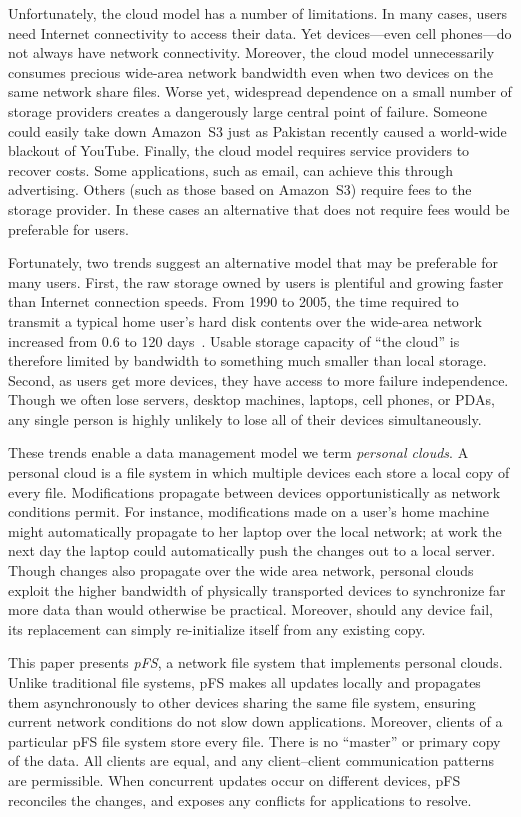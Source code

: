 Unfortunately, the cloud model has a number of limitations.  In many
cases, users need Internet connectivity to access their data.  Yet
devices---even cell phones---do not always have network connectivity.
Moreover, the cloud model unnecessarily consumes precious wide-area
network bandwidth even when two devices on the same network share
files.  Worse yet, widespread dependence on a small number of storage
providers creates a dangerously large central point of failure.
Someone could easily take down Amazon~S3 just as Pakistan recently
caused a world-wide blackout of YouTube.  Finally, the cloud model
requires service providers to recover costs.  Some applications, such
as email, can achieve this through advertising.  Others (such as those
based on Amazon~S3) require fees to the storage provider.  In these
cases an alternative that does not require fees would be preferable
for users.

Fortunately, two trends suggest an alternative model that may be
preferable for many users.  First, the raw storage owned by users is
plentiful and growing faster than Internet connection speeds.  From
1990 to 2005, the time required to transmit a typical home user's hard
disk contents over the wide-area network increased from 0.6 to 120
days~\cite{rodrigues:multi-hop}.  Usable storage capacity of ``the
cloud'' is therefore limited by bandwidth to something much smaller
than local storage.  Second, as users get more devices, they have
access to more failure independence.  Though we often lose servers,
desktop machines, laptops, cell phones, or PDAs, any single person is
highly unlikely to lose all of their devices simultaneously.

These trends enable a data management model we term \emph{personal
  clouds}.  A personal cloud is a file system in which multiple
devices each store a local copy of every file.  Modifications
propagate between devices opportunistically as network conditions
permit.  For instance, modifications made on a user's home machine
might automatically propagate to her laptop over the local network; at
work the next day the laptop could automatically push the changes out
to a local server.  Though changes also propagate over the wide area
network, personal clouds exploit the higher bandwidth of physically
transported devices to synchronize far more data than would otherwise
be practical.  Moreover, should any device fail, its replacement can
simply re-initialize itself from any existing copy.

This paper presents \emph{pFS}, a network file system that implements
personal clouds.  Unlike traditional file systems, pFS makes all
updates locally and propagates them asynchronously to other devices
sharing the same file system, ensuring current network conditions do
not slow down applications.  Moreover, clients of a particular pFS
file system store every file.  There is no ``master'' or primary copy
of the data.  All clients are equal, and any client--client
communication patterns are permissible.  When concurrent updates occur
on different devices, pFS reconciles the changes, and exposes any
conflicts for applications to resolve.

